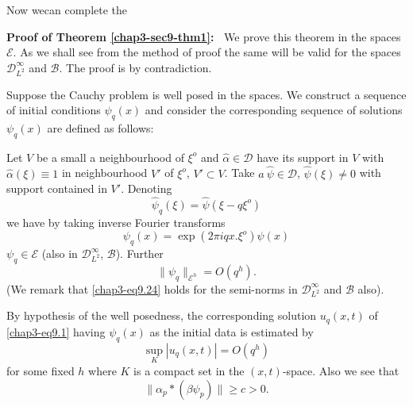 Now we\pageoriginale can complete the 

\smallskip
\noindent
{\bf Proof of Theorem \ref{chap3-sec9-thm1}:~}
We prove this theorem in the spaces $\mathscr{E}$. As we shall see from
the method of proof the same will be valid for the spaces
$\mathscr{D}^\infty_{L^2}$ and $\mathscr{B}$. The proof is by
contradiction. 

Suppose the Cauchy problem is well posed in the spaces. We construct a
sequence of initial conditions $\psi_q (x)$ and consider the
corresponding sequence of solutions $\psi_q(x)$ are defined as
follows: 

Let $V$ be a small a neighbourhood of $\xi^o$ and $\hat{\alpha} \in
\mathscr{D}$ have its support in $V$ with $\hat{\alpha} (\xi) \equiv
1$ in neighbourhood $V'$ of $\xi^o$, $V'  \subset V$. Take $a\
\hat{\psi} \in \mathscr{D}$, $\hat{\psi} (\xi) \neq 0$ with support
contained in $V'$. Denoting  
$$
\hat{\psi}_q ( \xi ) = \hat{\psi}( \xi - q \xi^o) 
$$
we have by taking inverse Fourier transforms
\begin{equation}
\psi_q (x) = \exp (2 \pi iqx. \xi^o ) \psi (x)
\tag{9.23} \label{chap3-eq9.23} 
\end{equation}
$\psi_q \in \mathscr{E}$ (also in $\mathscr{D}^\infty_{L^2}$,
$\mathscr{B}$). Further 
\begin{equation}
\| \psi_q \|_{\mathscr{E}^h} = O (q^h). \tag{9.24}\label{chap3-eq9.24}
\end{equation}
(We remark that \eqref{chap3-eq9.24} holds for the semi-norms in
$\mathscr{D}^\infty_{L^2}$ and $\mathscr{B}$ also). 

By hypothesis of the well posedness, the corresponding solution $u_q
(x,t)$ of \eqref{chap3-eq9.1} having $\psi_q(x)$ as the initial data
is estimated by   
\begin{equation*}
\sup\limits_{K} |u_q (x, t)| = O(q^h) \tag{9.25}\label{chap3-eq9.25}
\end{equation*}
for some fixed $h$ where $K$ is a compact set in the
$(x,t)$-space. Also we see that  
\begin{equation}
\| \alpha_p  * (\beta \psi_p) \| \ge c >
0. \tag{9.26}\label{chap3-eq9.26} 
\end{equation}\pageoriginale

